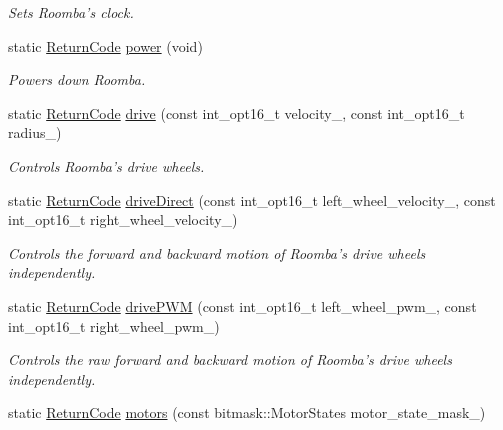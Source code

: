 \begin{DoxyCompactItemize}
\begin{DoxyCompactList}\small\item\em Sets Roomba’s clock. \end{DoxyCompactList}\item 
static \hyperlink{namespaceroomba_aff53babe0af88b1ea8b066fd18b8f23f}{Return\+Code} \hyperlink{classroomba_1_1_open_interface_af4e1dfd388fde037cb4a43d1d0e4ab82}{power} (void)
\begin{DoxyCompactList}\small\item\em Powers down Roomba. \end{DoxyCompactList}\item 
static \hyperlink{namespaceroomba_aff53babe0af88b1ea8b066fd18b8f23f}{Return\+Code} \hyperlink{classroomba_1_1_open_interface_ab8e47a5ccfb15ee74f5af6264c782fc7}{drive} (const int\+\_\+opt16\+\_\+t velocity\+\_\+, const int\+\_\+opt16\+\_\+t radius\+\_\+)
\begin{DoxyCompactList}\small\item\em Controls Roomba’s drive wheels. \end{DoxyCompactList}\item 
static \hyperlink{namespaceroomba_aff53babe0af88b1ea8b066fd18b8f23f}{Return\+Code} \hyperlink{classroomba_1_1_open_interface_a0e98db60c8347772d042c72ad97fab56}{drive\+Direct} (const int\+\_\+opt16\+\_\+t left\+\_\+wheel\+\_\+velocity\+\_\+, const int\+\_\+opt16\+\_\+t right\+\_\+wheel\+\_\+velocity\+\_\+)
\begin{DoxyCompactList}\small\item\em Controls the forward and backward motion of Roomba’s drive wheels independently. \end{DoxyCompactList}\item 
static \hyperlink{namespaceroomba_aff53babe0af88b1ea8b066fd18b8f23f}{Return\+Code} \hyperlink{classroomba_1_1_open_interface_a7295b2001bef68d63be2b0ab59200d1b}{drive\+P\+W\+M} (const int\+\_\+opt16\+\_\+t left\+\_\+wheel\+\_\+pwm\+\_\+, const int\+\_\+opt16\+\_\+t right\+\_\+wheel\+\_\+pwm\+\_\+)
\begin{DoxyCompactList}\small\item\em Controls the raw forward and backward motion of Roomba’s drive wheels independently. \end{DoxyCompactList}\item 
static \hyperlink{namespaceroomba_aff53babe0af88b1ea8b066fd18b8f23f}{Return\+Code} \hyperlink{classroomba_1_1_open_interface_ae112df7415692769172f54be0c206391}{motors} (const bitmask\+::\+Motor\+States motor\+\_\+state\+\_\+mask\+\_\+)

\end{DoxyCompactItemize}
